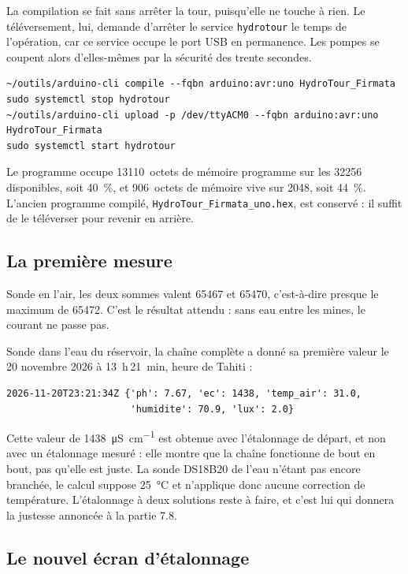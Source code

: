 La compilation se fait sans arrêter la tour, puisqu'elle ne touche à rien. Le téléversement, lui, demande d'arrêter le service \texttt{hydrotour} le temps de l'opération, car ce service occupe le port USB en permanence. Les pompes se coupent alors d'elles-mêmes par la sécurité des trente secondes.

\begin{verbatim}
~/outils/arduino-cli compile --fqbn arduino:avr:uno HydroTour_Firmata
sudo systemctl stop hydrotour
~/outils/arduino-cli upload -p /dev/ttyACM0 --fqbn arduino:avr:uno HydroTour_Firmata
sudo systemctl start hydrotour
\end{verbatim}

Le programme occupe \qty{13110}{octets} de mémoire programme sur les \qty{32256}{} disponibles, soit \qty{40}{\percent}, et \qty{906}{octets} de mémoire vive sur \qty{2048}{}, soit \qty{44}{\percent}. L'ancien programme compilé, \texttt{HydroTour\_Firmata\_uno.hex}, est conservé : il suffit de le téléverser pour revenir en arrière.

\subsection{La première mesure}

Sonde en l'air, les deux sommes valent \num{65467} et \num{65470}, c'est-à-dire presque le maximum de \num{65472}. C'est le résultat attendu : sans eau entre les mines, le courant ne passe pas.

Sonde dans l'eau du réservoir, la chaîne complète a donné sa première valeur le 20 novembre 2026 à \qty{13}{h}\,\qty{21}{min}, heure de Tahiti :

\begin{verbatim}
2026-11-20T23:21:34Z {'ph': 7.67, 'ec': 1438, 'temp_air': 31.0,
                      'humidite': 70.9, 'lux': 2.0}
\end{verbatim}

Cette valeur de \qty{1438}{\micro S\per cm} est obtenue avec l'étalonnage de départ, et non avec un étalonnage mesuré : elle montre que la chaîne fonctionne de bout en bout, pas qu'elle est juste. La sonde DS18B20 de l'eau n'étant pas encore branchée, le calcul suppose \qty{25}{\celsius} et n'applique donc aucune correction de température. L'étalonnage à deux solutions reste à faire, et c'est lui qui donnera la justesse annoncée à la partie 7.8.

\subsection{Le nouvel écran d'étalonnage}

